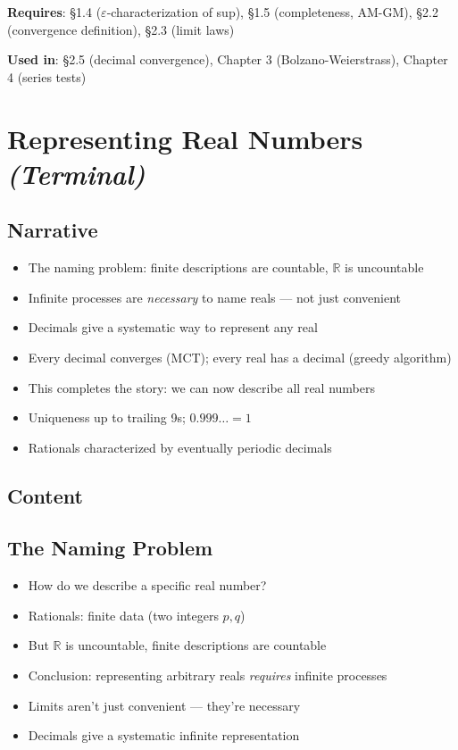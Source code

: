\documentclass[
  10pt,
  letterpaper,
]{scrbook}
\providecommand{\tightlist}{%
  \setlength{\itemsep}{0pt}\setlength{\parskip}{0pt}}
\newcommand{\RR}{\mathbb{R}}
\begin{document}
\textbf{Requires}: §1.4 (\(\varepsilon\)-characterization of sup), §1.5
(completeness, AM-GM), §2.2 (convergence definition), §2.3 (limit laws)

\textbf{Used in}: §2.5 (decimal convergence), Chapter 3
(Bolzano-Weierstrass), Chapter 4 (series tests)

\section{\texorpdfstring{Representing Real Numbers
\emph{(Terminal)}}{Representing Real Numbers (Terminal)}}\label{representing-real-numbers-terminal}

\subsection{Narrative}\label{narrative-9}

\begin{itemize}
\tightlist
\item
  The naming problem: finite descriptions are countable, \(\RR\) is
  uncountable
\item
  Infinite processes are \emph{necessary} to name reals --- not just
  convenient
\item
  Decimals give a systematic way to represent any real
\item
  Every decimal converges (MCT); every real has a decimal (greedy
  algorithm)
\item
  This completes the story: we can now describe all real numbers
\item
  Uniqueness up to trailing 9s; \(0.999\ldots = 1\)
\item
  Rationals characterized by eventually periodic decimals
\end{itemize}

\subsection{Content}\label{content-9}

\subsection{The Naming Problem}\label{the-naming-problem}

\begin{itemize}
\tightlist
\item
  How do we describe a specific real number?
\item
  Rationals: finite data (two integers \(p, q\))
\item
  But \(\RR\) is uncountable, finite descriptions are countable
\item
  Conclusion: representing arbitrary reals \emph{requires} infinite
  processes
\item
  Limits aren't just convenient --- they're necessary
\item
  Decimals give a systematic infinite representation
\end{itemize}
\end{document}
